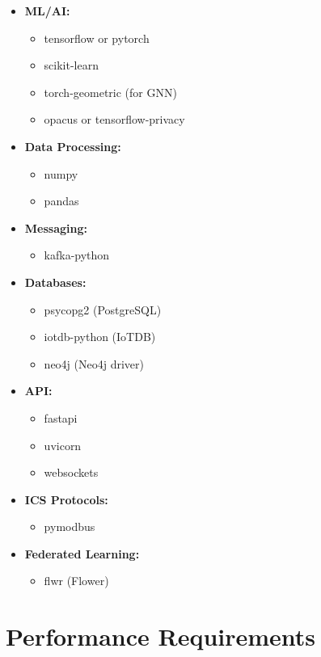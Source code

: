 \documentclass[12pt,a4paper]{article}
\begin{document}
\begin{itemize}[leftmargin=1cm,itemsep=0pt]
    \item \textbf{ML/AI:}
    \begin{itemize}
        \item tensorflow or pytorch
        \item scikit-learn
        \item torch-geometric (for GNN)
        \item opacus or tensorflow-privacy
    \end{itemize}
    \item \textbf{Data Processing:}
    \begin{itemize}
        \item numpy
        \item pandas
    \end{itemize}
    \item \textbf{Messaging:}
    \begin{itemize}
        \item kafka-python
    \end{itemize}
    \item \textbf{Databases:}
    \begin{itemize}
        \item psycopg2 (PostgreSQL)
        \item iotdb-python (IoTDB)
        \item neo4j (Neo4j driver)
    \end{itemize}
    \item \textbf{API:}
    \begin{itemize}
        \item fastapi
        \item uvicorn
        \item websockets
    \end{itemize}
    \item \textbf{ICS Protocols:}
    \begin{itemize}
        \item pymodbus
    \end{itemize}
    \item \textbf{Federated Learning:}
    \begin{itemize}
        \item flwr (Flower)
    \end{itemize}
\end{itemize}


\section{Performance Requirements}
\end{document}
